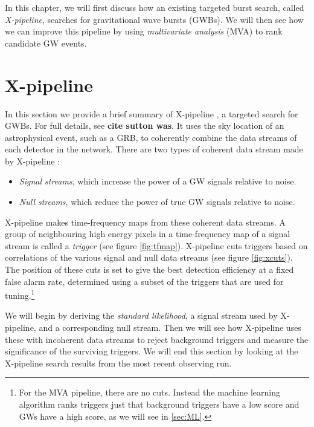 \documentclass[11pt]{cuthesis}
\newcommand{\xp}{X-pipeline }
\begin{document}
In this chapter, we will first discuss how an existing targeted burst search, called \textit{X-pipeline}, searches for gravitational wave bursts (GWBs). We will then see how we can improve this pipeline by using \textit{multivariate analysis} (MVA) to rank candidate GW events.  

\section{X-pipeline} \label{xtriggers}
In this section we provide a brief summary of {\xp}, a targeted search for GWBs. For full details, see \textbf{cite sutton was}. It uses the sky location of an astrophysical event, such as a GRB, to coherently combine the data streams of each detector in the network. There are two types of coherent data stream made by \xp:
\begin{itemize}
\item \textit{Signal streams}, which increase the power of a GW signals relative to noise.
\item \textit{Null streams}, which reduce the power of true GW signals relative to noise.
\end{itemize}
\xp makes time-frequency maps from these coherent data streams. A group of neighbouring high energy pixels in a time-frequency map of a signal stream is called a  \textit{trigger} (see figure \ref{fig:tfmap}). \xp cuts triggers based on correlations of the various signal and null data streams (see figure \ref{fig:xcuts}). The position of these cuts is set to give the best detection efficiency at a fixed false alarm rate, determined using a subset of the triggers that are used for tuning.\footnote{For the MVA pipeline, there are no cuts. Instead the machine learning algorithm ranks triggers just that background triggers have a low score and GWs have a high score, as we will see in \ref{sec:ML}.}

We will begin by deriving the \textit{standard likelihood}, a signal stream used by X-pipeline, and a corresponding null stream. Then we will see how \xp uses these with incoherent data streams to reject background triggers and measure the significance of the surviving triggers. We will end this section by looking at the \xp search results from the most recent observing run.  
\end{document}
